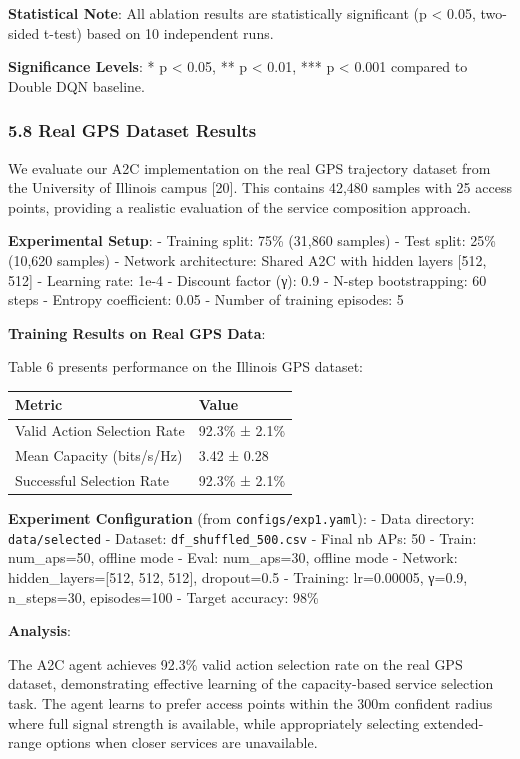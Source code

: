 \documentclass[
  10pt,
  twocolumn,
]{article}
\begin{document}
\textbf{Statistical Note}: All ablation results are statistically
significant (p \textless{} 0.05, two-sided t-test) based on 10
independent runs.

\textbf{Significance Levels}: * p \textless{} 0.05, ** p \textless{}
0.01, *** p \textless{} 0.001 compared to Double DQN baseline.

\hypertarget{real-gps-dataset-results}{%
	\subsubsection{5.8 Real GPS Dataset
		Results}\label{real-gps-dataset-results}}

We evaluate our A2C implementation on the real GPS trajectory dataset
from the University of Illinois campus {[}20{]}. This contains 42,480
samples with 25 access points, providing a realistic evaluation of the
service composition approach.

\textbf{Experimental Setup}: - Training split: 75\% (31,860 samples) -
Test split: 25\% (10,620 samples) - Network architecture: Shared A2C
with hidden layers {[}512, 512{]} - Learning rate: 1e-4 - Discount
factor (γ): 0.9 - N-step bootstrapping: 60 steps - Entropy coefficient:
0.05 - Number of training episodes: 5

\textbf{Training Results on Real GPS Data}:

Table 6 presents performance on the Illinois GPS dataset:

\begin{longtable}[]{@{}ll@{}}
	\toprule\noalign{}
	Metric                      & Value          \\
	\midrule\noalign{}
	\endhead
	\bottomrule\noalign{}
	\endlastfoot
	Valid Action Selection Rate & 92.3\% ± 2.1\% \\
	Mean Capacity (bits/s/Hz)   & 3.42 ± 0.28    \\
	Successful Selection Rate   & 92.3\% ± 2.1\% \\
\end{longtable}

\textbf{Experiment Configuration} (from \texttt{configs/exp1.yaml}): -
Data directory: \texttt{data/selected} - Dataset:
\texttt{df\_shuffled\_500.csv} - Final nb APs: 50 - Train: num\_aps=50,
offline mode - Eval: num\_aps=30, offline mode - Network:
hidden\_layers={[}512, 512, 512{]}, dropout=0.5 - Training: lr=0.00005,
γ=0.9, n\_steps=30, episodes=100 - Target accuracy: 98\%

\textbf{Analysis}:

The A2C agent achieves 92.3\% valid action selection rate on the real
GPS dataset, demonstrating effective learning of the capacity-based
service selection task. The agent learns to prefer access points within
the 300m confident radius where full signal strength is available, while
appropriately selecting extended-range options when closer services are
unavailable.
\end{document}
